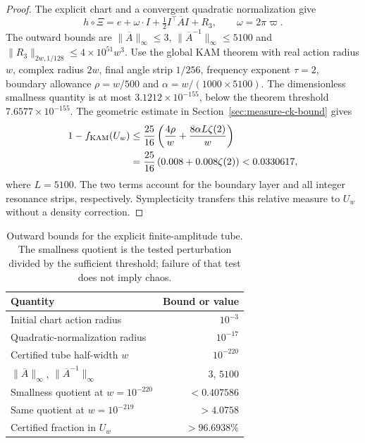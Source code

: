 \begin{proof}
The explicit chart and a convergent quadratic normalization give
\[
 h\circ\Xi=e+\omega\cdot I+\tfrac12 I^\top\overline A I+R_3,
 \qquad \omega=2\pi\varpi.
\]
The outward bounds are
$\|\overline A\|_\infty\leq3$,
$\|\overline A^{-1}\|_\infty\leq5100$ and
$\|R_3\|_{2w,1/128}\leq4\times10^{51}w^3$.
Use the global KAM theorem with real action radius $w$, complex radius
$2w$, final angle strip $1/256$, frequency exponent $\tau=2$,
boundary allowance $\rho=w/500$ and
$\alpha=w/(1000\times5100)$.
The dimensionless smallness quantity is at most
$3.1212\times10^{-155}$, below the theorem threshold
$7.6577\times10^{-155}$.
The geometric estimate in Section~\ref{sec:measure-ck-bound} gives
\begin{equation}
 \begin{aligned}
 1-f_{\rm KAM}(U_w)
 &\leq\frac{25}{16}\left(
      \frac{4\rho}{w}+\frac{8\alpha L\zeta(2)}{w}\right)\\
 &=\frac{25}{16}\left(0.008+0.008\zeta(2)\right)
 <0.0330617,
 \end{aligned}
 \label{eq:measure-budget}
\end{equation}
where $L=5100$. The two terms account for the boundary layer and all
integer resonance strips, respectively. Symplecticity transfers this
relative measure to $U_w$ without a density correction.
\end{proof}

\begin{table}[t]
\centering\small
\caption{Outward bounds for the explicit finite-amplitude tube.
The smallness quotient is the tested perturbation divided by the
sufficient threshold; failure of that test does not imply chaos.}
\label{tab:measure-tube-certificate}
\begin{tabular}{lr}
\hline
Quantity & Bound or value\\
\hline
Initial chart action radius & $10^{-3}$\\
Quadratic-normalization radius & $10^{-17}$\\
Certified tube half-width $w$ & $10^{-220}$\\
$\|\overline A\|_\infty$, $\|\overline A^{-1}\|_\infty$ & $3$, $5100$\\
Smallness quotient at $w=10^{-220}$ & $<0.407586$\\
Same quotient at $w=10^{-219}$ & $>4.0758$\\
Certified fraction in $U_w$ & $>96.6938\%$\\
\hline
\end{tabular}
\end{table}

